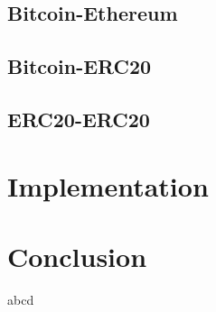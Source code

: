 \documentclass[twocolumn]{article}
\begin{document}
\subsection{Bitcoin-Ethereum}
\subsection{Bitcoin-ERC20}
\subsection{ERC20-ERC20}

\section{Implementation}

\section{Conclusion}
abcd


\end{document}
